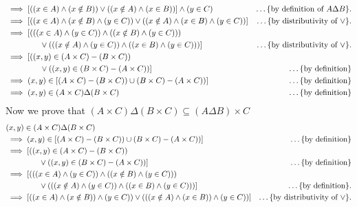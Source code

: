 \documentclass[12pt]{scrartcl}
\begin{document}
\begin{enumerate}
\begin{align*}
        \\ & \implies [((x \in A) \land (x \notin B)) \lor ((x \notin A) \land (x \in B))] \land (y \in C) & \ldots \text{\{by definition of $A  \Delta B$\}}.
        \\ & \implies [((x \in A) \land (x \notin B) \land (y \in C)) \lor ((x \notin A) \land (x \in B) \land (y \in C))] & \ldots \text{\{by distributivity of $\lor$\}}.
        \\ & \implies [(((x \in A) \land (y \in C)) \land ((x \notin B) \land (y \in C))) &
        \\ & \hspace{1.5cm} \lor (((x \notin A) \land (y \in C)) \land ((x \in B) \land (y \in C)))] & \ldots \text{\{by distributivity of $\lor$\}}.
        \\ &\implies [((x,y) \in (A \times C) - (B \times C))
        \\ & \hspace{1.5cm} \lor ((x,y) \in (B \times C) - (A \times C))] & \ldots \text{\{by definition\}}
        \\ & \implies (x,y) \in [(A \times C) - (B \times C)) \cup (B \times C) - (A \times C))] & \ldots \text{\{by definition\}}        
        \\ & \implies (x,y) \in (A \times C) \Delta (B \times C) &  \ldots \text{\{by definition\}}
    \end{align*}
    Now we prove that $(A \times C) \Delta (B \times C) \subseteq (A \Delta B) \times C$
    \begin{align*}
        & (x,y) \in (A \times C) \Delta (B \times C) & 
        \\ & \implies (x,y) \in [(A \times C) - (B \times C)) \cup (B \times C) - (A \times C))] & \ldots \text{\{by definition\}}        
        \\ &\implies [((x,y) \in (A \times C) - (B \times C))
        \\ & \hspace{1.5cm} \lor ((x,y) \in (B \times C) - (A \times C))] & \ldots \text{\{by definition\}}
        \\ & \implies [(((x \in A) \land (y \in C)) \land ((x \notin B) \land (y \in C))) &
        \\ & \hspace{1.5cm} \lor (((x \notin A) \land (y \in C)) \land ((x \in B) \land (y \in C)))] & \ldots \text{\{by definition\}}.   
        \\ & \implies [((x \in A) \land (x \notin B)) \land (y \in C)) \lor (((x \notin A) \land (x \in B)) \land (y \in C))] & \ldots \text{\{by distributivity of $\lor$\}}.

\end{align*}
\end{enumerate}
\end{document}
